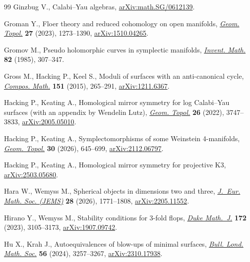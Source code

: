 \documentclass[10pt,a4paper]{amsart}
\theoremstyle{definition}
\numberwithin{equation}{section}
\begin{document}
\begin{thebibliography}{99}
Ginzbug V., Calabi--{Y}au algebras,
 \href{http://arxiv.org/abs/math.SG/0612139}{arXiv:math.SG/0612139}.

Groman Y., Floer theory and reduced cohomology on open manifolds,
 \href{https://doi.org/10.2140/gt.2023.27.1273}{\textit{Geom. Topol.}}
 \textbf{27} (2023), 1273--1390,
 \href{http://arxiv.org/abs/1510.04265}{arXiv:1510.04265}.

Gromov M., Pseudo holomorphic curves in symplectic manifolds,
 \href{https://doi.org/10.1007/BF01388806}{\textit{Invent. Math.}} \textbf{82}
 (1985), 307--347.

Gross M., Hacking P., Keel S., Moduli of surfaces with an anti-canonical cycle,
 \href{https://doi.org/10.1112/S0010437X14007611}{\textit{Compos. Math.}}
 \textbf{151} (2015), 265--291,
 \href{http://arxiv.org/abs/1211.6367}{arXiv:1211.6367}.

Hacking P., Keating A., Homological mirror symmetry for log {C}alabi--{Y}au
 surfaces (with an appendix by {W}endelin {L}utz),
 \href{https://doi.org/10.2140/gt.2022.26.3747}{\textit{Geom. Topol.}}
 \textbf{26} (2022), 3747--3833,
 \href{http://arxiv.org/abs/2005.05010}{arXiv:2005.05010}.

Hacking P., Keating A., Symplectomorphisms of some {W}einstein 4-manifolds,
 \href{https://doi.org/10.2140/gt.2026.30.645}{\textit{Geom. Topol.}}
 \textbf{30} (2026), 645--699,
 \href{http://arxiv.org/abs/2112.06797}{arXiv:2112.06797}.

Hacking P., Keating A., Homological mirror symmetry for projective {K}3,
 \href{http://arxiv.org/abs/2503.05680}{arXiv:2503.05680}.

Hara W., Wemyss M., Spherical objects in dimensions two and three,
 \href{https://doi.org/10.4171/jems/1504}{\textit{J.~Eur. Math. Soc. (JEMS)}}
 \textbf{28} (2026), 1771--1808,
 \href{http://arxiv.org/abs/2205.11552}{arXiv:2205.11552}.

Hirano Y., Wemyss M., Stability conditions for 3-fold flops,
 \href{https://doi.org/10.1215/00127094-2022-0097}{\textit{Duke Math.~J.}}
 \textbf{172} (2023), 3105--3173,
 \href{http://arxiv.org/abs/1907.09742}{arXiv:1907.09742}.

Hu X., Krah J., Autoequivalences of blow-ups of minimal surfaces,
 \href{https://doi.org/10.1112/blms.13131}{\textit{Bull. Lond. Math. Soc.}}
 \textbf{56} (2024), 3257--3267,
 \href{http://arxiv.org/abs/2310.17938}{arXiv:2310.17938}.


\end{thebibliography}
\end{document}
